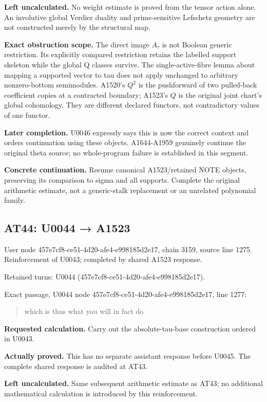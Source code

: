 \textbf{Left uncalculated.} No weight estimate is proved from the tensor
action alone. An involutive global Verdier duality and prime-sensitive
Lefschetz geometry are not constructed merely by the structural map.

\textbf{Exact obstruction scope.} The direct image \(A_\tau\) is not
Boolean generic restriction. Its explicitly compared restriction retains
the labelled support skeleton while the global Q classes survive. The
single-active-fibre lemma about mapping a supported vector to tau does
not apply unchanged to arbitrary nonzero-bottom semimodules. A1520's
\(Q^2\) is the pushforward of two pulled-back coefficient copies at a
contracted boundary; A1523's \(Q\) is the original joint chart's global
cohomology. They are different declared functors, not contradictory
values of one functor.

\textbf{Later completion.} U0046 expressly says this is now the correct
context and orders continuation using these objects. A1644-A1959
genuinely continue the original theta source; no whole-program failure
is established in this segment.

\textbf{Concrete continuation.} Resume canonical A1523/retained NOTE
objects, preserving its comparison to sigma and all supports. Complete
the original arithmetic estimate, not a generic-stalk replacement or an
unrelated polynomial family.

\subsection{AT44: U0044 → A1523}\label{at44-u0044-a1523}

User node 457e7cf8-ce51-4d20-afe4-e998185d2e17, chain 3159, source line
1275. Reinforcement of U0043; completed by shared A1523 response.

Retained turns: U0044 (457e7cf8-ce51-4d20-afe4-e998185d2e17).

Exact passage, U0044 node 457e7cf8-ce51-4d20-afe4-e998185d2e17, line
1277:

\begin{quote}
which is thus what you will in fact do
\end{quote}

\textbf{Requested calculation.} Carry out the absolute-tau-base
construction ordered in U0043.

\textbf{Actually proved.} This has no separate assistant response before
U0045. The complete shared response is audited at AT43.

\textbf{Left uncalculated.} Same subsequent arithmetic estimate as AT43;
no additional mathematical calculation is introduced by this
reinforcement.

